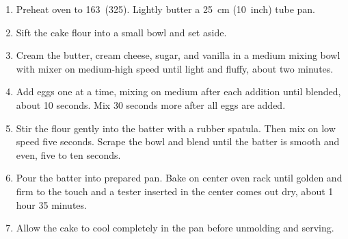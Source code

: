 \prep{}

\begin{ingredients}
\end{ingredients}


\begin{recipe}
  \begin{enumerate}

  \item Preheat oven to 163\C\ (325\F).  Lightly butter a 25~cm
    (10~inch) tube pan.

  \item Sift the cake flour into a small bowl and set aside.

  \item Cream the butter, cream cheese, sugar, and vanilla in a medium
    mixing bowl with mixer on medium-high speed until light and
    fluffy, about two minutes.

  \item Add eggs one at a time, mixing on medium after each addition
    until blended, about 10 seconds.  Mix 30 seconds more after all
    eggs are added.

  \item Stir the flour gently into the batter with a rubber spatula.
    Then mix on low speed five seconds.  Scrape the bowl and blend
    until the batter is smooth and even, five to ten seconds.

  \item Pour the batter into prepared pan.  Bake on center oven rack
    until golden and firm to the touch and a tester inserted in the
    center comes out dry, about 1 hour 35 minutes.

  \item Allow the cake to cool completely in the pan before unmolding
    and serving.

  \end{enumerate}
\end{recipe}
